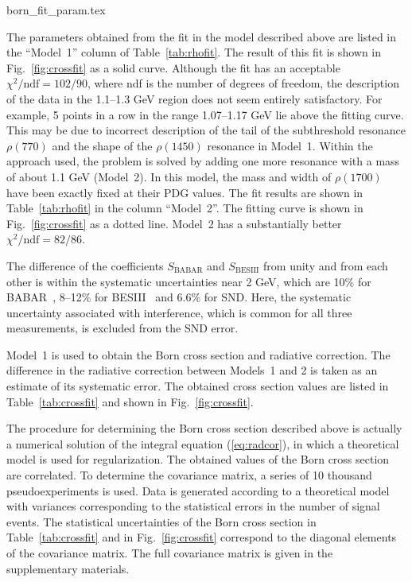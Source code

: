 \documentclass[twocolumn,aps,prd,floatfix,nofootinbib,superscriptaddress]{revtex4-2}
\begin{document}
\begin{table}
\caption{The parameters of the two models of the Born cross section obtained from the fit described in the text.}
\label{tab:rhofit}
\begin{ruledtabular}
{born_fit_param.tex}
\end{ruledtabular}
\end{table}

The parameters obtained from the fit in the model described above are listed in the ``Model~1'' column of Table~\ref{tab:rhofit}.
The result of this fit is shown in Fig.~\ref{fig:crossfit} as a solid curve.
Although the fit has an acceptable $\chi^2 / \text{ndf} = 102 / 90$, where ndf is the number of degrees of freedom, the description of the data in the 1.1--1.3 GeV region does not seem entirely satisfactory.
For example, 5 points in a row in the range 1.07--1.17 GeV lie above the fitting curve.
This may be due to incorrect description of the tail of the subthreshold resonance $\rho(770)$ and the shape of the $\rho(1450)$ resonance in Model~1.
Within the approach used, the problem is solved by adding one more resonance with a mass of about 1.1 GeV (Model~2).
In this model, the mass and width of $\rho(1700)$ have been exactly fixed at their PDG values.
The fit results are shown in Table~\ref{tab:rhofit} in the column ``Model~2''.
The fitting curve is shown in Fig.~\ref{fig:crossfit} as a dotted line.
Model~2 has a substantially better $\chi^2 / \text{ndf} = 82 / 86$.

The difference of the coefficients $S_\text{BABAR}$ and $S_\text{BESIII}$ from unity and from each other is within the systematic uncertainties near 2 GeV, which are 10\% for BABAR~\cite{babar17}, 8--12\% for BESIII~\cite{bes2021} and 6.6\% for SND.
Here, the systematic uncertainty associated with interference, which is common for all three measurements, is excluded from the SND error.

Model~1 is used to obtain the Born cross section and radiative correction.
The difference in the radiative correction between Models~1 and 2 is taken as an estimate of its systematic error.
The obtained cross section values are listed in Table~\ref{tab:crossfit} and shown in Fig.~\ref{fig:crossfit}.

The procedure for determining the Born cross section described above is actually a numerical solution of the integral equation (\ref{eq:radcor}), in which a theoretical model is used for regularization.
The obtained values of the Born cross section are correlated.
To determine the covariance matrix, a series of 10 thousand pseudoexperiments is used.
Data is generated according to a theoretical model with variances corresponding to the statistical errors in the number of signal events.
The statistical uncertainties of the Born cross section in Table~\ref{tab:crossfit} and in Fig.~\ref{fig:crossfit} correspond to the diagonal elements of the covariance matrix.
The full covariance matrix is given in the supplementary materials.
\end{document}
